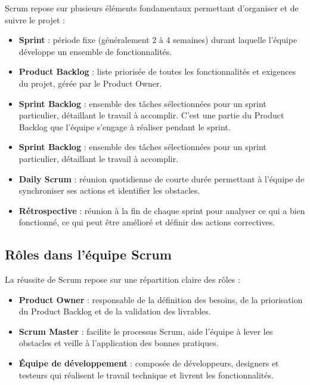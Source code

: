 Scrum repose sur plusieurs éléments fondamentaux permettant d’organiser et de suivre le projet :
\begin{itemize}
    \item \textbf{Sprint} : période fixe (généralement 2 à 4 semaines) durant laquelle l’équipe développe un ensemble de fonctionnalités.\\
    \item \textbf{Product Backlog} : liste priorisée de toutes les fonctionnalités et exigences du projet, gérée par le Product Owner.\\
    \item \textbf{Sprint Backlog} : ensemble des tâches sélectionnées pour un sprint particulier, détaillant le travail à accomplir. C’est une partie du Product Backlog que l’équipe s’engage à réaliser pendant le sprint.\\
    \item \textbf{Sprint Backlog} : ensemble des tâches sélectionnées pour un sprint particulier, détaillant le travail à accomplir.\\
    \item \textbf{Daily Scrum} : réunion quotidienne de courte durée permettant à l’équipe de synchroniser ses actions et identifier les obstacles.\\
    \item \textbf{Rétrospective} : réunion à la fin de chaque sprint pour analyser ce qui a bien fonctionné, ce qui peut être amélioré et définir des actions correctives.
\end{itemize}

\subsection{Rôles dans l’équipe Scrum}

La réussite de Scrum repose sur une répartition claire des rôles :\\
\begin{itemize}
    \item \textbf{Product Owner} : responsable de la définition des besoins, de la priorisation du Product Backlog et de la validation des livrables.\\
    \item \textbf{Scrum Master} : facilite le processus Scrum, aide l’équipe à lever les obstacles et veille à l’application des bonnes pratiques.\\
    \item \textbf{Équipe de développement} : composée de développeurs, designers et testeurs qui réalisent le travail technique et livrent les fonctionnalités.
\end{itemize}

